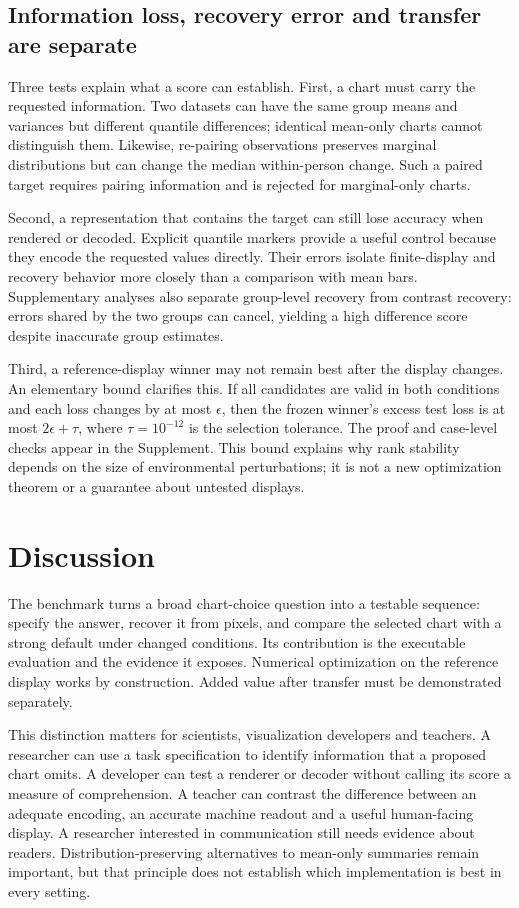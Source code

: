 \documentclass[11pt]{article}
\begin{document}
\subsection*{Information loss, recovery error and transfer are separate}
Three tests explain what a score can establish. First, a chart must carry the requested information. Two datasets can have the same group means and variances but different quantile differences; identical mean-only charts cannot distinguish them. Likewise, re-pairing observations preserves marginal distributions but can change the median within-person change. Such a paired target requires pairing information and is rejected for marginal-only charts.

Second, a representation that contains the target can still lose accuracy when rendered or decoded. Explicit quantile markers provide a useful control because they encode the requested values directly. Their errors isolate finite-display and recovery behavior more closely than a comparison with mean bars. Supplementary analyses also separate group-level recovery from contrast recovery: errors shared by the two groups can cancel, yielding a high difference score despite inaccurate group estimates.

Third, a reference-display winner may not remain best after the display changes. An elementary bound clarifies this. If all candidates are valid in both conditions and each loss changes by at most $\epsilon$, then the frozen winner's excess test loss is at most $2\epsilon+\tau$, where $\tau=10^{-12}$ is the selection tolerance. The proof and case-level checks appear in the Supplement. This bound explains why rank stability depends on the size of environmental perturbations; it is not a new optimization theorem or a guarantee about untested displays.

\section*{Discussion}
The benchmark turns a broad chart-choice question into a testable sequence: specify the answer, recover it from pixels, and compare the selected chart with a strong default under changed conditions. Its contribution is the executable evaluation and the evidence it exposes. Numerical optimization on the reference display works by construction. Added value after transfer must be demonstrated separately.

This distinction matters for scientists, visualization developers and teachers. A researcher can use a task specification to identify information that a proposed chart omits. A developer can test a renderer or decoder without calling its score a measure of comprehension. A teacher can contrast the difference between an adequate encoding, an accurate machine readout and a useful human-facing display. A researcher interested in communication still needs evidence about readers. Distribution-preserving alternatives to mean-only summaries remain important, but that principle does not establish which implementation is best in every setting.\cite{weissgerber2015,rousselet2017}
\end{document}
